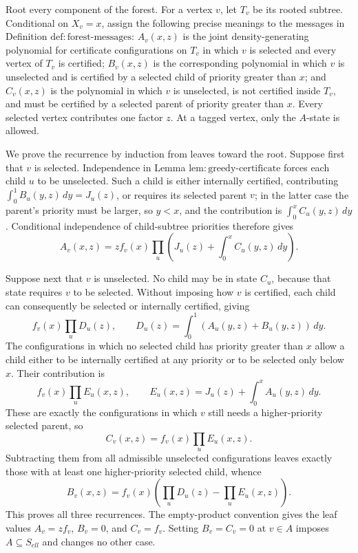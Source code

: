 Root every component of the forest.  For a vertex \(v\), let \(T_v\) be its rooted subtree.  Conditional on \(X_v=x\), assign the following precise meanings to the messages in Definition \(\mathrm{def:forest\mbox{-}messages}\): \(A_v(x,z)\) is the joint density-generating polynomial for certificate configurations on \(T_v\) in which \(v\) is selected and every vertex of \(T_v\) is certified; \(B_v(x,z)\) is the corresponding polynomial in which \(v\) is unselected and is certified by a selected child of priority greater than \(x\); and \(C_v(x,z)\) is the polynomial in which \(v\) is unselected, is not certified inside \(T_v\), and must be certified by a selected parent of priority greater than \(x\).  Every selected vertex contributes one factor \(z\).  At a tagged vertex, only the \(A\)-state is allowed.

We prove the recurrence by induction from leaves toward the root.  Suppose first that \(v\) is selected.  Independence in Lemma \(\mathrm{lem:greedy\mbox{-}certificate}\) forces each child \(u\) to be unselected.  Such a child is either internally certified, contributing \(\int_0^1B_u(y,z)\,dy=J_u(z)\), or requires its selected parent \(v\); in the latter case the parent's priority must be larger, so \(y<x\), and the contribution is \(\int_0^xC_u(y,z)\,dy\).  Conditional independence of child-subtree priorities therefore gives
\[
 A_v(x,z)=zf_v(x)\prod_u\left(J_u(z)+\int_0^xC_u(y,z)\,dy\right).
\]

Suppose next that \(v\) is unselected.  No child may be in state \(C_u\), because that state requires \(v\) to be selected.  Without imposing how \(v\) is certified, each child can consequently be selected or internally certified, giving
\[
 f_v(x)\prod_uD_u(z),
 \qquad
 D_u(z)=\int_0^1(A_u(y,z)+B_u(y,z))\,dy.
\]
The configurations in which no selected child has priority greater than \(x\) allow a child either to be internally certified at any priority or to be selected only below \(x\).  Their contribution is
\[
 f_v(x)\prod_uE_u(x,z),
 \qquad
 E_u(x,z)=J_u(z)+\int_0^xA_u(y,z)\,dy.
\]
These are exactly the configurations in which \(v\) still needs a higher-priority selected parent, so
\[
 C_v(x,z)=f_v(x)\prod_uE_u(x,z).
\]
Subtracting them from all admissible unselected configurations leaves exactly those with at least one higher-priority selected child, whence
\[
 B_v(x,z)=f_v(x)\left(\prod_uD_u(z)-\prod_uE_u(x,z)\right).
\]
This proves all three recurrences.  The empty-product convention gives the leaf values \(A_v=zf_v\), \(B_v=0\), and \(C_v=f_v\).  Setting \(B_v=C_v=0\) at \(v\in A\) imposes \(A\subseteq S_{ell}\) and changes no other case.

